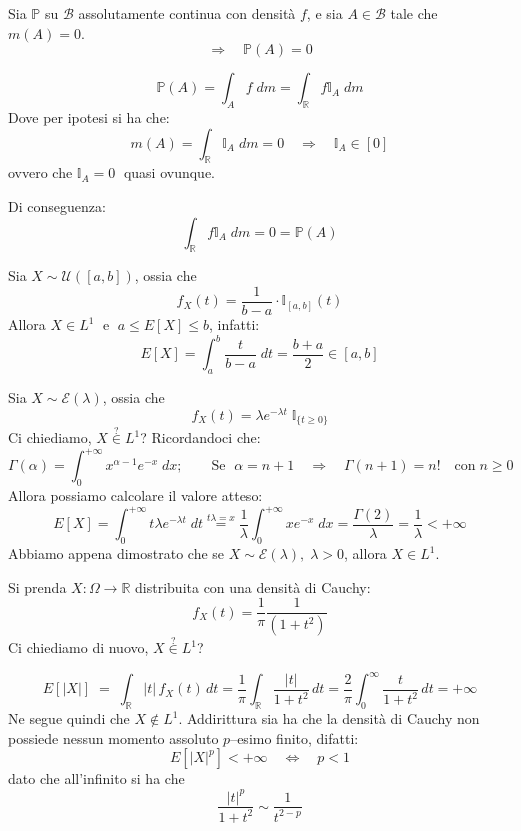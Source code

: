 \begin{teorema}
    Sia $\mathbb{P}$ su $\mathcal{B}$ assolutamente continua con densità $f$, e sia $A\in\mathcal{B}$ tale che $m(A) = 0$.
    \[\Rightarrow\quad \mathbb{P}(A) = 0\]
    \begin{dimostrazione}
        \[\mathbb{P}(A) = \int_A f\;dm = \int_\mathbb{R} f \mathbb{I}_A\; dm\]
        Dove per ipotesi si ha che:
        \[m(A) = \int_\mathbb{R}\mathbb{I}_A\;dm = 0\quad \Rightarrow\quad \mathbb{I}_A\in[0]\]
        ovvero che $\mathbb{I}_A = 0\;$ quasi ovunque.

        \medskip
        \noindent Di conseguenza:
        \[\int_\mathbb{R}f\mathbb{I}_A\;dm = 0= \mathbb{P}(A)\]
    \end{dimostrazione}
\end{teorema}
\begin{esempio}
    Sia $X\sim\mathcal{U}([a, b])$, ossia che
    \[f_X(t) = \frac{1}{b-a}\cdot \mathbb{I}_{[a, b]}(t)\]
    Allora $X\in L^1\;$ e $\;a\leq E[X]\leq b$, infatti:
    \[E[X] = \int_a^b\frac{t}{b-a}\;dt = \frac{b+a}{2}\in[a, b]\]
\end{esempio}
\begin{esempio}
    Sia $X\sim \mathcal{E}(\lambda)$, ossia che
    \[f_X(t) = \lambda e^{-\lambda t} \;\mathbb{I}_{\{t\geq0\}}\]
    Ci chiediamo, $X\overset{?}{\in }L^1$?
    Ricordandoci che:
    \[\Gamma(\alpha) = \int_0^{+\infty} x^{\alpha -1} e^{-x}\;dx;\qquad \text{Se }\;\alpha = n+1\quad \Rightarrow\quad \Gamma(n+1) = n!\quad \text{con}\;n\geq0\]
    Allora possiamo calcolare il valore atteso: 
    \[E[X] = \int_0^{+\infty} t\lambda e^{-\lambda t}\;dt \overset{t\lambda = x}{=} \frac{1}{\lambda} \int_0^{+\infty} x e^{-x}\;dx = \frac{\Gamma(2)}{\lambda}=\frac{1}{\lambda}<+\infty \]
    Abbiamo appena dimostrato che se $X\sim\mathcal{E}(\lambda),\;\lambda>0$, allora $X\in L^1$.
\end{esempio}
\begin{esempio}
    Si prenda $X:\Omega \to \mathbb{R}$ distribuita con una densità di Cauchy:
    \[f_X(t) = \frac{1}{\pi}\frac{1}{(1+t^2)}\]
    Ci chiediamo di nuovo, $X\overset{?}{\in }L^1$?
    
    \[E[|X|] \;=\; \int_{\mathbb{R}} |t|\, f_X(t)\,dt
= \frac{1}{\pi}\int_{\mathbb{R}} \frac{|t|}{1+t^2}\,dt
= \frac{2}{\pi}\int_{0}^{\infty} \frac{t}{1+t^2}\,dt = +\infty\]
Ne segue quindi che $X\notin L^1$. Addirittura sia ha che la densità di Cauchy non possiede nessun momento assoluto $p$--esimo finito, difatti:
\[E[|X|^p] <+\infty \quad \iff \quad p<1\]
dato che all'infinito si ha che
\[\frac{|t|^p}{1+t^2}\sim\frac{1}{t^{2-p}}\]
    
\end{esempio}



